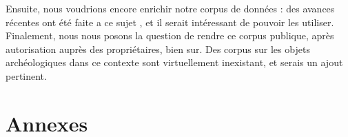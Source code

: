 \documentclass[a4paper, 12pt, titlepage, oneside, french]{article}
\begin{document}
	Ensuite, nous voudrions encore enrichir notre corpus de données : des avances récentes ont été faite a ce sujet \cite{DatasetTranfo}, et il serait intéressant de pouvoir les utiliser. Finalement, nous nous posons la question de rendre ce corpus publique, après autorisation auprès des propriétaires, bien sur. Des corpus sur les objets archéologiques dans ce contexte sont virtuellement inexistant, et serais un ajout pertinent. 
\newpage
\section{Annexes}

\medskip
\newpage
\printbibliography
\end{document}
